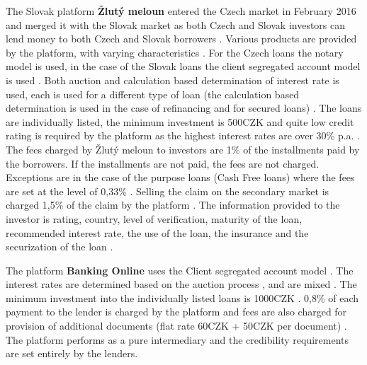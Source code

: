 The Slovak platform \textbf{Žlutý meloun} entered the Czech market in February 2016 and merged it with the Slovak market as both Czech and Slovak investors can lend money to both Czech and Slovak borrowers \cite[]{ZlutymelounONas}. Various products are provided by the platform, with varying characteristics \cite[]{ZlutymelounProdukty}. For the Czech loans the notary model is used, in the case of the Slovak loans the client segregated account model is used \cite[]{ZlutymelounBezpecnost}. Both auction and calculation based determination of interest rate is used, each is used for a different type of loan (the calculation based determination is used in the case of refinancing and for secured loans) \cite[]{ZlutymelounProdukty}. The loans are individually listed, the minimum investment is 500CZK \cite[]{ZlutymelounInvestovani} and quite low credit rating is required by the platform as the highest interest rates are over 30\% p.a. \cite[]{ZlutymelounStatistika}. The fees charged by Žlutý meloun to investors are 1\% of the installments paid by the borrowers. If the installments are not paid, the fees are not charged. Exceptions are in the case of the purpose loans (Cash Free loans) where the fees are set at the level of 0,33\% \cite[]{ZlutymelounPoplatky}. Selling the claim on the secondary market is charged 1,5\% of the claim by the platform \cite[]{ZlutymelounSazebnik}. The information provided to the investor is rating, country, level of verification, maturity of the loan, recommended interest rate, the use of the loan, the insurance and the securization of the loan \cite[]{ZlutymelounTrziste}.

The platform \textbf{Banking Online} uses the Client segregated account model \cite[]{BankingOnlineSmlouva}. The interest rates are determined based on the auction process \cite[]{BankingOnlineJakToFunguje}, and are mixed \cite[]{BankingOnlineZadatele}. The minimum investment into the individually listed loans is 1000CZK \cite[]{BankingOnlineJakInvestovat}. 0,8\% of each payment to the lender is charged by the platform and fees are also charged for provision of additional documents (flat rate 60CZK + 50CZK per document) \cite[]{BankingOnlineSazebnik}. The platform performs as a pure intermediary and the credibility requirements are set entirely by the lenders.

